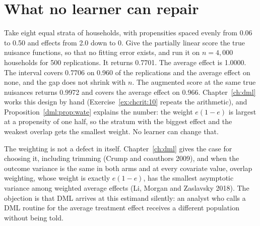 \section{What no learner can repair}\label{sec:crit:repair}

Take eight equal strata of households, with propensities spaced evenly from 0.06 to 0.50 and effects from 2.0 down to 0. Give the partially linear score the true nuisance functions, so that no fitting error exists, and run it on $n = 4{,}000$ households for 500 replications. It returns 0.7701. The average effect is 1.0000. The interval covers 0.7706 on 0.960 of the replications and the average effect on none, and the gap does not shrink with $n$. The augmented score at the same true nuisances returns 0.9972 and covers the average effect on 0.966. Chapter~\ref{ch:dml} works this design by hand (Exercise~\ref{ex:chcrit:10} repeats the arithmetic), and Proposition~\ref{dml:prop:wate} explains the number: the weight $e(1 - e)$ is largest at a propensity of one half, so the stratum with the biggest effect and the weakest overlap gets the smallest weight. No learner can change that.

The weighting is not a defect in itself. Chapter~\ref{ch:dml} gives the case for choosing it, including trimming (Crump and coauthors 2009), and when the outcome variance is the same in both arms and at every covariate value, overlap weighting, whose weight is exactly $e(1 - e)$, has the smallest asymptotic variance among weighted average effects (Li, Morgan and Zaslavsky 2018). The objection is that DML arrives at this estimand silently: an analyst who calls a DML routine for the average treatment effect receives a different population without being told.

